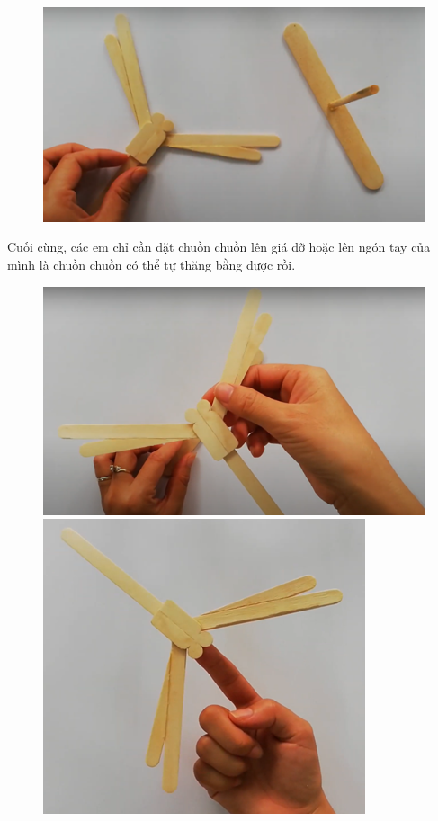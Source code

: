 \begin{multicols}{2}
\begin{figure}[H]
		\includegraphics[width= 1\linewidth]{59}
		\vspace*{-10pt}
	\end{figure}
	Cuối cùng, các em chỉ cần đặt chuồn chuồn lên giá đỡ hoặc lên ngón tay của mình là chuồn chuồn có thể tự thăng bằng được rồi.
	\begin{figure}[H]
		\vspace*{-5pt}
		\centering
		\captionsetup{labelformat= empty, justification=centering}
		\includegraphics[width= 1\linewidth]{60}
		\includegraphics[width= 1\linewidth]{61}

\end{figure}
\end{multicols}
